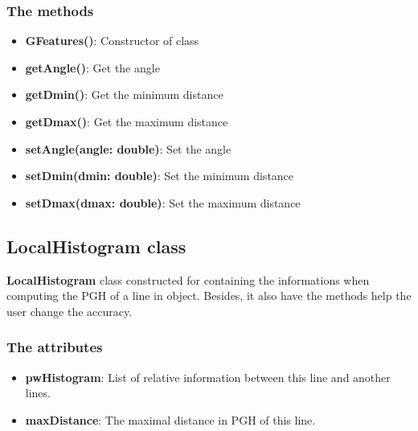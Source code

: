 \subsubsection{The methods}
\begin{itemize}
\item\textbf{GFeatures()}: Constructor of class
\item\textbf{getAngle()}: Get the angle 
\item\textbf{getDmin()}: Get the minimum distance
\item\textbf{getDmax()}: Get the maximum distance
\item\textbf{setAngle(angle: double)}: Set the angle
\item\textbf{setDmin(dmin: double)}: Set the minimum distance
\item\textbf{setDmax(dmax: double)}: Set the maximum distance
\end{itemize}
\subsection{LocalHistogram class}
\textbf{LocalHistogram} class constructed for containing the informations when computing the PGH of a line in object. Besides, it also have the methods help the user change the accuracy.
\subsubsection{The attributes}
\begin{itemize}
\item\textbf{pwHistogram}: List of relative information between this line and another lines. 
\item\textbf{maxDistance}: The maximal distance in PGH of this line.
\end{itemize}
